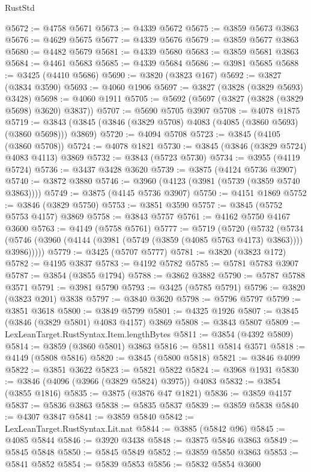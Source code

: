 \begin{lexlean}{RustStd}
\begin{coremodule}
@5672 := @4758 @5671
@5673 := @4339 @5672
@5675 := @3859 @5673 @3863
@5676 := @4629 @5675
@5677 := @4339 @5676
@5679 := @3859 @5677 @3863
@5680 := @4482 @5679
@5681 := @4339 @5680
@5683 := @3859 @5681 @3863
@5684 := @4461 @5683
@5685 := @4339 @5684
@5686 := @3981 @5685
@5688 := @3425 (@4410 @5686)
@5690 := @3820 (@3823 @167)
@5692 := @3827 (@3834 @3590)
@5693 := @4060 @1906
@5697 := @3827 (@3828 (@3829 @5693) @3428)
@5698 := @4060 @1911
@5705 := @5692 (@5697 (@3827 (@3828 (@3829 @5698) @3620) @3837))
@5707 := @5690 @5705 @3907
@5708 := @4078 @1875
@5719 := @3843 (@3845 (@3846 (@3829 @5708) @4083 (@4085 (@3860 @5693) (@3860 @5698))) @3869)
@5720 := @4094 @5708
@5723 := @3845 (@4105 (@3860 @5708))
@5724 := @4078 @1821
@5730 := @3845 (@3846 (@3829 @5724) @4083 @4113) @3869
@5732 := @3843 (@5723 @5730)
@5734 := @3955 (@4119 @5724)
@5736 := @3437 @3428 @3620
@5739 := @3875 (@4124 @5736 @3907)
@5740 := @3872 @3880
@5746 := @3960 (@4123 (@3981 (@5739 (@3859 @5740 @3863))))
@5749 := @3875 (@4145 @5736 @3907)
@5750 := @4151 @1869
@5752 := @3846 (@3829 @5750)
@5753 := @3851 @3590
@5757 := @3845 (@5752 @5753 @4157) @3869
@5758 := @3843 @5757
@5761 := @4162 @5750 @4167 @3600
@5763 := @4149 (@5758 @5761)
@5777 := @5719
    (@5720
      (@5732
        (@5734 (@5746 (@3960 (@4144 (@3981 (@5749 (@3859 (@4085 @5763 @4173) @3863)))) @3986)))))
@5779 := @3425 (@5707 @5777)
@5781 := @3820 (@3823 @172)
@5782 := @4195 @3837
@5783 := @4192 @5782
@5785 := @5781 @5783 @3907
@5787 := @3854 (@3855 @1794)
@5788 := @3862 @3882
@5790 := @5787 @5788 @3571
@5791 := @3981 @5790
@5793 := @3425 (@5785 @5791)
@5796 := @3820 (@3823 @201) @3838
@5797 := @3840 @3620
@5798 := @5796 @5797
@5799 := @3851 @3618
@5800 := @3849 @5799
@5801 := @4325 @1926
@5807 := @3845 (@3846 (@3829 @5801) @4083 @4157) @3869
@5808 := @3843 @5807
@5809 := LexLeanTarget.RustSyntax.Item.lengthBytes
@5811 := @3854 (@4392 @5809)
@5814 := @3859 (@3860 @5801) @3863
@5816 := @5811 @5814 @3571
@5818 := @4149 (@5808 @5816)
@5820 := @3845 (@5800 @5818)
@5821 := @3846 @4099
@5822 := @3851 @3622
@5823 := @5821 @5822
@5824 := @3968 @1931
@5830 := @3846 (@4096 (@3966 (@3829 @5824) @3975)) @4083
@5832 := @3854 (@3855 @1816)
@5835 := @3875 (@3876 @47 @1821)
@5836 := @3859 @4157
@5837 := @5836 @3863
@5838 := @5835 @5837
@5839 := @3859 @5838
@5840 := @4307 @3847
@5841 := @3859 @5840
@5842 := LexLeanTarget.RustSyntax.Lit.nat
@5844 := @3885 (@5842 @96)
@5845 := @4085 @5844
@5846 := @3920 @3438
@5848 := @3875 @5846 @3863
@5849 := @5845 @5848
@5850 := @5845 @5849
@5852 := @3859 @5850 @3863
@5853 := @5841 @5852
@5854 := @5839 @5853
@5856 := @5832 @5854 @3600

\end{coremodule}
\end{lexlean}
